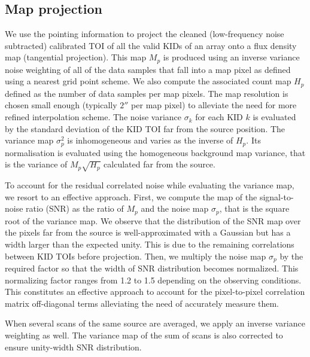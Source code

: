 \documentclass[traditionalabstract]{aa}
\newcommand{\lp}[1]{#1}
\begin{document}
\subsection{Map projection}
\label{se:map_projection}
We use the pointing information to project the cleaned (low-frequency
noise subtracted) calibrated TOI of all the valid KIDs of an array
onto a flux density map (tangential projection). This map $M_p$ is produced using an inverse
variance noise weighting of all of the data samples that fall into a map
pixel as defined using a nearest grid point scheme. We also compute
the associated count map $H_p$ defined as the number of data samples
per map pixels. The map resolution
is chosen small enough (typically $2''$ per map pixel) to alleviate
the need for more refined interpolation scheme. The noise variance
$\sigma_k$ for each KID $k$ is evaluated by the standard deviation of the
KID TOI far from the source position. 
{\lp The variance map $\sigma_p^2$ is inhomogeneous and varies as the
inverse of $H_p$. Its normalisation is evaluated using the
homogeneous background map variance, that is the
variance of $M_p\sqrt{H_p}$ calculated far from the source.}

{\lp To account for the residual
correlated noise while evaluating the variance map, we resort to an
effective approach.
First, we compute the map of the signal-to-noise ratio (SNR) as the ratio of
$M_p$ and the noise map $\sigma_p$, that is the square root of the
variance map. We observe that the distribution of the SNR map over the pixels far from the source is
well-approximated with a Gaussian but has a width larger than the
expected unity. This is due to the remaining correlations between KID TOIs
before projection. Then, we multiply the noise map 
$\sigma_p$ by the required factor so
that the width of SNR distribution becomes normalized.
This normalizing factor ranges from 1.2 to 1.5 depending on the observing conditions. This
constitutes an effective approach to account for the pixel-to-pixel
correlation matrix off-diagonal terms alleviating the need of
accurately measure them.}

When several scans of the same source are averaged, we apply an inverse
variance weighting as well. 
The variance map of the sum of scans is also corrected to ensure unity-width
SNR distribution.
\end{document}
